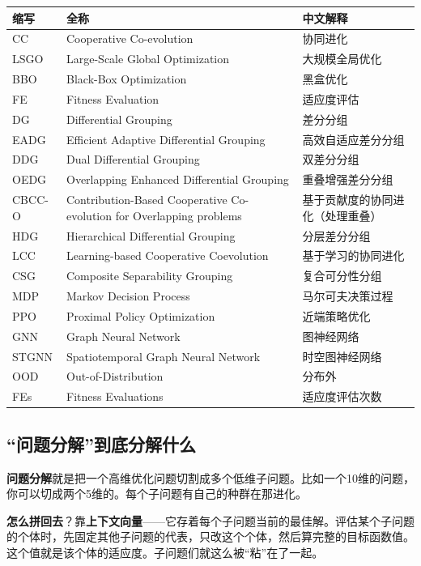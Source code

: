 \begin{center}
\begin{tabular}{p{2cm}p{8cm}p{4cm}}
\toprule
\textbf{缩写} & \textbf{全称} & \textbf{中文解释} \\
\midrule
CC & Cooperative Co-evolution & 协同进化 \\
LSGO & Large-Scale Global Optimization & 大规模全局优化 \\
BBO & Black-Box Optimization & 黑盒优化 \\
FE & Fitness Evaluation & 适应度评估 \\
DG & Differential Grouping & 差分分组 \\
EADG & Efficient Adaptive Differential Grouping & 高效自适应差分分组 \\
DDG & Dual Differential Grouping & 双差分分组 \\
OEDG & Overlapping Enhanced Differential Grouping & 重叠增强差分分组 \\
CBCC-O & Contribution-Based Cooperative Co-evolution for Overlapping problems & 基于贡献度的协同进化（处理重叠） \\
HDG & Hierarchical Differential Grouping & 分层差分分组 \\
LCC & Learning-based Cooperative Coevolution & 基于学习的协同进化 \\
CSG & Composite Separability Grouping & 复合可分性分组 \\
MDP & Markov Decision Process & 马尔可夫决策过程 \\
PPO & Proximal Policy Optimization & 近端策略优化 \\
GNN & Graph Neural Network & 图神经网络 \\
STGNN & Spatiotemporal Graph Neural Network & 时空图神经网络 \\
OOD & Out-of-Distribution & 分布外 \\
FEs & Fitness Evaluations & 适应度评估次数 \\
\bottomrule
\end{tabular}
\end{center}

\subsection{“问题分解”到底分解什么}
\textbf{问题分解}就是把一个高维优化问题切割成多个低维子问题。比如一个10维的问题，你可以切成两个5维的。每个子问题有自己的种群在那进化。

\textbf{怎么拼回去}？靠\textbf{上下文向量}——它存着每个子问题当前的最佳解。评估某个子问题的个体时，先固定其他子问题的代表，只改这个个体，然后算完整的目标函数值。这个值就是该个体的适应度。子问题们就这么被“粘”在了一起。


